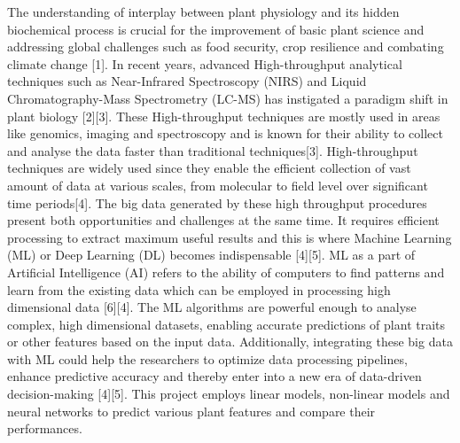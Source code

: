 \documentclass[12pt,a4paper]{report}
\begin{document}
The understanding of interplay between plant physiology and its hidden biochemical process is crucial for the improvement of basic plant science and addressing global challenges such as food security, crop resilience and combating climate change [1]. 
In recent years, advanced High-throughput analytical techniques such as Near-Infrared Spectroscopy (NIRS) and Liquid Chromatography-Mass Spectrometry (LC-MS) has instigated a paradigm shift in plant biology [2][3].
These High-throughput techniques are mostly used in areas like genomics, imaging and spectroscopy and is known for their ability to collect and analyse the data faster than traditional techniques[3].
High-throughput techniques are widely used since they enable the efficient collection of vast amount of data at various scales, from molecular to field level over significant time periods[4].
The big data generated by these high throughput procedures present both opportunities and challenges at the same time. It requires efficient processing to extract maximum useful results and this is where Machine Learning (ML) or Deep Learning (DL) becomes indispensable [4][5].
ML as a part of Artificial Intelligence (AI) refers to the ability of computers to find patterns and learn from the existing data which can be employed in processing high dimensional data [6][4]. The ML algorithms are powerful enough to analyse complex, high dimensional datasets, 
enabling accurate predictions of plant traits or other features based on the input data. Additionally, integrating these big data with ML could help the researchers to optimize data processing pipelines, enhance predictive accuracy and thereby enter into a new era of data-driven decision-making [4][5]. This project employs linear models, non-linear models and neural networks to predict various plant features and compare their performances. \\
\end{document}
